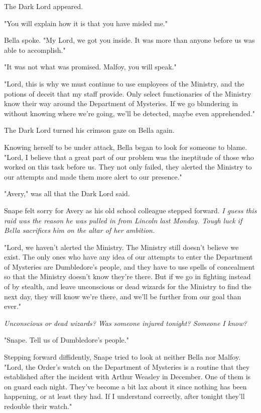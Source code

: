 The Dark Lord appeared.

"You will explain how it is that you have misled me."

Bella spoke. "My Lord, we got you inside. It was more than anyone before us was able to accomplish."

"It was not what was promised. Malfoy, you will speak."

"Lord, this is why we must continue to use employees of the Ministry, and the potions of deceit that my staff provide. Only select functionaries of the Ministry know their way around the Department of Mysteries. If we go blundering in without knowing where we're going, we'll be detected, maybe even apprehended."

The Dark Lord turned his crimson gaze on Bella again.

Knowing herself to be under attack, Bella began to look for someone to blame. "Lord, I believe that a great part of our problem was the ineptitude of those who worked on this task before us. They not only failed, they alerted the Ministry to our attempts and made them more alert to our presence."

"Avery," was all that the Dark Lord said.

Snape felt sorry for Avery as his old school colleague stepped forward. \emph{I guess this raid was the reason he was pulled in from Lincoln last Monday. Tough luck if Bella sacrifices him on the altar of her ambition.}

"Lord, we haven't alerted the Ministry. The Ministry still doesn't believe we exist. The only ones who have any idea of our attempts to enter the Department of Mysteries are Dumbledore's people, and they have to use spells of concealment so that the Ministry doesn't know they're there. But if we go in fighting instead of by stealth, and leave unconscious or dead wizards for the Ministry to find the next day, they will know we're there, and we'll be further from our goal than ever."

\emph{Unconscious or dead wizards? Was someone injured tonight? Someone I know?}

"Snape. Tell us of Dumbledore's people."

Stepping forward diffidently, Snape tried to look at neither Bella nor Malfoy. "Lord, the Order's watch on the Department of Mysteries is a routine that they established after the incident with Arthur Weasley in December. One of them is on guard each night. They've become a bit lax about it since nothing has been happening, or at least they had. If I understand correctly, after tonight they'll redouble their watch."

